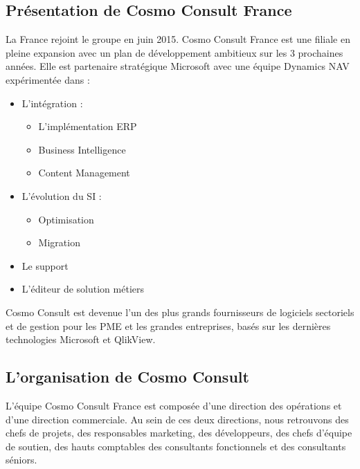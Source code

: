 \documentclass[12pt]{article}
\begin{document}
	\subsection{Présentation de Cosmo Consult France}
\hspace{1cm} La France rejoint le groupe en juin 2015. Cosmo Consult France est une filiale en pleine expansion avec un plan de développement ambitieux sur les 3 prochaines années. Elle est partenaire stratégique Microsoft avec une équipe Dynamics NAV expérimentée dans :
\begin{itemize}
	\item L’intégration :
		\begin{itemize}
			\item L’implémentation ERP
			\item Business Intelligence
			\item Content Management
		\end{itemize}
		
	\item L’évolution du SI :
		\begin{itemize}
			\item Optimisation
			\item Migration
		\end{itemize}	 
	\item Le support  
	\item L'éditeur de solution métiers
\end{itemize}

\hspace{1cm} Cosmo Consult est devenue l'un des plus grands fournisseurs de logiciels sectoriels et de gestion pour les PME et les grandes entreprises, basés sur les dernières technologies Microsoft et QlikView.\\

	\subsection{L'organisation de Cosmo Consult}
\hspace{1cm}L'équipe Cosmo Consult France est composée d'une direction des opérations et d'une direction commerciale. Au sein de ces deux directions, nous retrouvons des chefs de projets, des responsables marketing, des développeurs, des chefs d'équipe de soutien, des hauts comptables des consultants fonctionnels et des consultants séniors.\\
\end{document}
